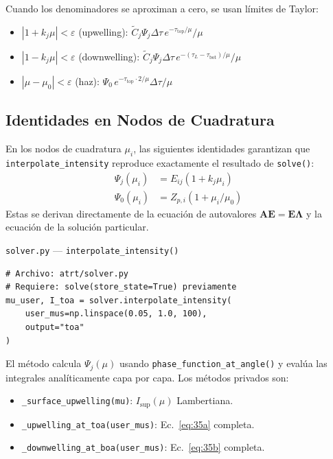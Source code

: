 \documentclass[a4paper,11pt]{article}
\begin{document}
Cuando los denominadores se aproximan a cero, se usan l\'imites de Taylor:
\begin{itemize}
\item $|1 + k_j \mu| < \varepsilon$ (upwelling): $\widetilde{C}_j \Psi_j \Delta\tau \, e^{-\tau_{\text{top}}/\mu} / \mu$
\item $|1 - k_j \mu| < \varepsilon$ (downwelling): $\widetilde{C}_j \Psi_j \Delta\tau \, e^{-(\tau_L - \tau_{\text{bot}})/\mu} / \mu$
\item $|\mu - \mu_0| < \varepsilon$ (haz): $\Psi_0 \, e^{-\tau_{\text{top}} \cdot 2/\mu} \Delta\tau / \mu$
\end{itemize}

\subsection{Identidades en Nodos de Cuadratura}

En los nodos de cuadratura $\mu_i$, las siguientes identidades garantizan que \texttt{interpolate\_intensity} reproduce exactamente el resultado de \texttt{solve()}:
\begin{align}
\Psi_j(\mu_i) &= E_{ij} (1 + k_j \mu_i) \\
\Psi_0(\mu_i) &= Z_{p,i} (1 + \mu_i / \mu_0)
\end{align}
Estas se derivan directamente de la ecuaci\'on de autovalores $\mathbf{A}\mathbf{E} = \mathbf{E}\boldsymbol{\Lambda}$ y la ecuaci\'on de la soluci\'on particular.

\begin{implementation}{\texttt{solver.py} --- \texttt{interpolate\_intensity()}}
\begin{lstlisting}
# Archivo: atrt/solver.py
# Requiere: solve(store_state=True) previamente
mu_user, I_toa = solver.interpolate_intensity(
    user_mus=np.linspace(0.05, 1.0, 100),
    output="toa"
)
\end{lstlisting}
El m\'etodo calcula $\Psi_j(\mu)$ usando \texttt{phase\_function\_at\_angle()} y eval\'ua las integrales anal\'iticamente capa por capa.  Los m\'etodos privados son:
\begin{itemize}
\item \texttt{\_surface\_upwelling(mu)}: $I_{\text{sup}}(\mu)$ Lambertiana.
\item \texttt{\_upwelling\_at\_toa(user\_mus)}: Ec.~\eqref{eq:35a} completa.
\item \texttt{\_downwelling\_at\_boa(user\_mus)}: Ec.~\eqref{eq:35b} completa.
\end{itemize}
\end{implementation}
\end{document}
